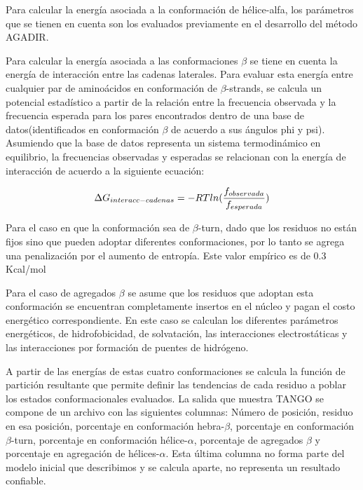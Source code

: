 Para calcular la energía asociada a la conformación de hélice-alfa, los parámetros que se tienen en cuenta son los evaluados previamente en el desarrollo del método AGADIR\cite{lacroix1998elucidating}.

Para calcular la energía asociada a las conformaciones $\beta$ se tiene en cuenta la energía de interacción entre las cadenas laterales.
Para evaluar esta energía entre 
cualquier par de aminoácidos en conformación de $\beta$-strands, se calcula un potencial estadístico a partir de la relación 
entre la frecuencia observada y la frecuencia esperada para los pares encontrados dentro de una base de datos(identificados en conformación $\beta$ de acuerdo a sus ángulos phi y psi).
Asumiendo que la base de datos representa un sistema termodinámico en equilibrio, la frecuencias observadas y esperadas se relacionan con la energía de interacción de acuerdo a la siguiente ecuación:

\begin{equation}
\large
 \Delta G_{interacc-cadenas}=-RTln(\frac{f_{observada}}{f_{esperada}})
\end{equation}

Para el caso en que la conformación sea de $\beta$-turn, dado que los residuos no están fijos sino que pueden adoptar diferentes conformaciones, por lo tanto se agrega una penalización por el aumento de entropía.
Este valor empírico es de 0.3 Kcal/mol

Para el caso de agregados $\beta$ se asume que los residuos que adoptan esta conformación se encuentran completamente insertos en el núcleo y pagan el costo energético correspondiente. 
En este caso se calculan los diferentes parámetros energéticos, de hidrofobicidad, de solvatación, las interacciones electrostáticas y las interacciones por formación de puentes de hidrógeno.

A partir de las energías de estas cuatro conformaciones se calcula la función de partición resultante que permite definir las tendencias de cada residuo a poblar los estados conformacionales evaluados.
La salida que muestra TANGO se compone de un archivo con las siguientes columnas:
Número de posición, residuo en esa posición, porcentaje en conformación hebra-$\beta$, porcentaje en conformación $\beta$-turn, porcentaje en conformación hélice-$\alpha$, porcentaje de agregados $\beta$ y
porcentaje en agregación de hélices-$\alpha$.
Esta última columna no forma parte del modelo inicial que describimos y se calcula aparte, no representa un resultado confiable.

